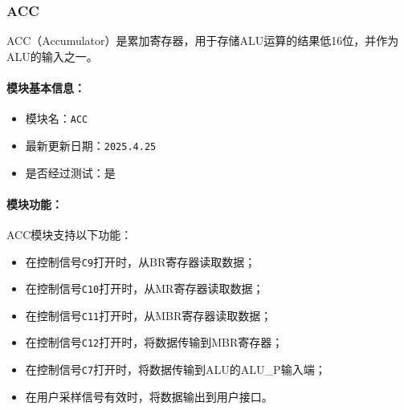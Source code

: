 \documentclass[lang=cn,a4paper,newtx]{elegantpaper}
\begin{document}
\subsubsection{ACC}
ACC（Accumulator）是累加寄存器，用于存储ALU运算的结果低16位，并作为ALU的输入之一。

\paragraph{模块基本信息：}
\begin{itemize}
  \item 模块名：\texttt{ACC}
  \item 最新更新日期：\texttt{2025.4.25}
  \item 是否经过测试：是
\end{itemize}

\paragraph{模块功能：}
ACC模块支持以下功能：
\begin{itemize}
  \item 在控制信号\texttt{C9}打开时，从BR寄存器读取数据；
  \item 在控制信号\texttt{C10}打开时，从MR寄存器读取数据；
  \item 在控制信号\texttt{C11}打开时，从MBR寄存器读取数据；
  \item 在控制信号\texttt{C12}打开时，将数据传输到MBR寄存器；
  \item 在控制信号\texttt{C7}打开时，将数据传输到ALU的ALU\_P输入端；
  \item 在用户采样信号有效时，将数据输出到用户接口。
\end{itemize}
\end{document}
